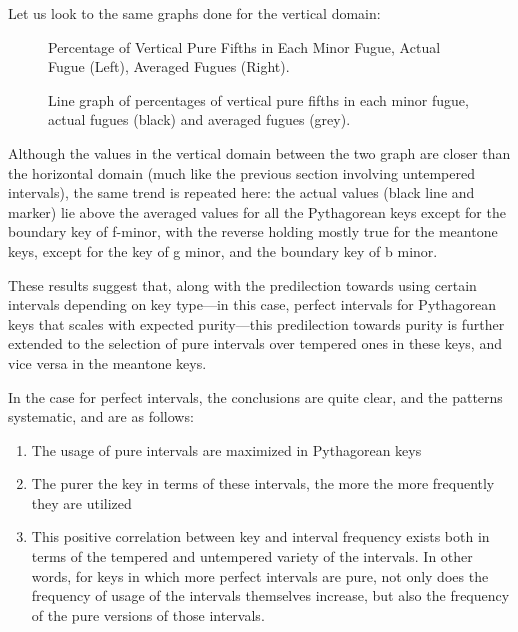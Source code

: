 Let us look to the same graphs done for the vertical domain:



\begin{figure}[H]
    \begin{center}
    \caption[Percentage of Vertical Pure Fifths in Each Minor Fugue. ]{Percentage of Vertical Pure Fifths in Each Minor Fugue, Actual Fugue (Left), Averaged Fugues (Right).}
    \end{center}
\end{figure}
    



\begin{figure}[H]
    \begin{center}
    \caption[Line graph of percentages of vertical pure fifths in each minor fugue, actual fugues vs. averaged fugues. ]{Line graph of percentages of vertical pure fifths in each minor fugue, actual fugues (black) and averaged fugues (grey).}
    \end{center}
\end{figure}
    
    Although the values in the vertical domain between the two graph are
closer than the horizontal domain (much like the previous section
involving untempered intervals), the same trend is repeated here: the
actual values (black line and marker) lie above the averaged values for
all the Pythagorean keys except for the boundary key of f-minor, with
the reverse holding mostly true for the meantone keys, except for the
key of g minor, and the boundary key of b minor.

These results suggest that, along with the predilection towards using
certain intervals depending on key type---in this case, perfect
intervals for Pythagorean keys that scales with expected
purity---this predilection towards purity is further extended to the
selection of pure intervals over tempered ones in these keys, and vice
versa in the meantone keys.

In the case for perfect intervals, the conclusions are quite clear, and
the patterns systematic, and are as follows:

\begin{enumerate}
\def\labelenumi{\arabic{enumi}.}
\tightlist
\item
  The usage of pure intervals are maximized in Pythagorean keys
\item
  The purer the key in terms of these intervals, the more the more
  frequently they are utilized
\item
  This positive correlation between key and interval frequency exists
  both in terms of the tempered and untempered variety of the intervals.
  In other words, for keys in which more perfect intervals are pure, not
  only does the frequency of usage of the intervals themselves increase,
  but also the frequency of the pure versions of those intervals.
\end{enumerate}

